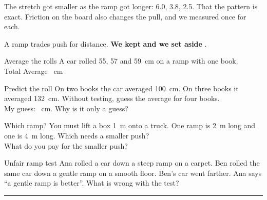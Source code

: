 \begin{center}
\end{center}

{The stretch got smaller as the ramp got longer: 6.0, 3.8, 2.5.}
{That the pattern is exact. Friction on the board also changes the pull, and we measured once for each.}

\begin{keepbox}
A ramp trades push for distance. \textbf{We kept} \wline[3.4cm] \textbf{and we set aside} \wline[3.4cm].
\end{keepbox}

\clearpage

\begin{puzzle}{Average the rolls}
A car rolled 55, 57 and 59~cm on a ramp with one book.\\
Total \wline[1.6cm] Average \wline[1.6cm]~cm
\end{puzzle}

\begin{puzzle}{Predict the roll}
On two books the car averaged 100~cm. On three books it averaged 132~cm. Without testing, guess the average for four books.\\
My guess: \wline[2cm]~cm. Why is it only a guess? \wline[3cm]
\end{puzzle}

\begin{puzzle}{Which ramp?}
You must lift a box 1~m onto a truck. One ramp is 2~m long and one is 4~m long. Which needs a smaller push? \wline[2cm]\\
What do you pay for the smaller push? \wline[3cm]
\end{puzzle}

\begin{puzzle}{Unfair ramp test}
Ana rolled a car down a steep ramp on a carpet. Ben rolled the same car down a gentle ramp on a smooth floor. Ben's car went farther. Ana says ``a gentle ramp is better''. What is wrong with the test?\\
\rule{\linewidth}{0.5pt}
\end{puzzle}

